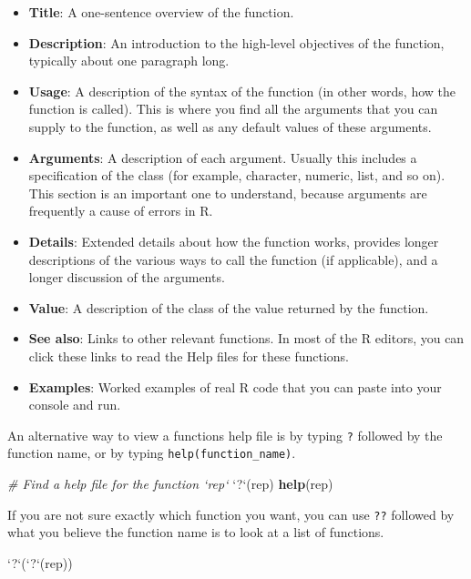 \documentclass[
]{book}
\newenvironment{Shaded}{\begin{snugshade}}{\end{snugshade}}
\newcommand{\CommentTok}[1]{\textcolor[rgb]{0.56,0.35,0.01}{\textit{#1}}}
\newcommand{\DataTypeTok}[1]{\textcolor[rgb]{0.13,0.29,0.53}{#1}}
\newcommand{\KeywordTok}[1]{\textcolor[rgb]{0.13,0.29,0.53}{\textbf{#1}}}
\newcommand{\NormalTok}[1]{#1}
\newcommand{\StringTok}[1]{\textcolor[rgb]{0.31,0.60,0.02}{#1}}
\begin{document}
\begin{itemize}
\item
  \textbf{Title}: A one-sentence overview of the function.
\item
  \textbf{Description}: An introduction to the high-level objectives of the function, typically about one paragraph long.
\item
  \textbf{Usage}: A description of the syntax of the function (in other words, how the function is called). This is where you find all the arguments that you can supply to the function, as well as any default values of these arguments.
\item
  \textbf{Arguments}: A description of each argument. Usually this includes a specification of the class (for example, character, numeric, list, and so on). This section is an important one to understand, because arguments are frequently a cause of errors in R.
\item
  \textbf{Details}: Extended details about how the function works, provides longer descriptions of the various ways to call the function (if applicable), and a longer discussion of the arguments.
\item
  \textbf{Value}: A description of the class of the value returned by the function.
\item
  \textbf{See also}: Links to other relevant functions. In most of the R editors, you can click these links to read the Help files for these functions.
\item
  \textbf{Examples}: Worked examples of real R code that you can paste into your console and run.
\end{itemize}

An alternative way to view a functions help file is by typing \texttt{?} followed by the function name, or by typing \texttt{help(function\_name)}.

\begin{Shaded}
\begin{Highlighting}[]
\CommentTok{# Find a help file for the function `rep`}
\StringTok{`}\DataTypeTok{?}\StringTok{`}\NormalTok{(rep)}
\KeywordTok{help}\NormalTok{(rep)}
\end{Highlighting}
\end{Shaded}

If you are not sure exactly which function you want, you can use \texttt{??} followed by what you believe the function name is to look at a list of functions.

\begin{Shaded}
\begin{Highlighting}[]
\StringTok{`}\DataTypeTok{?}\StringTok{`}\NormalTok{(}\StringTok{`}\DataTypeTok{?}\StringTok{`}\NormalTok{(rep))}
\end{Highlighting}
\end{Shaded}
\end{document}
